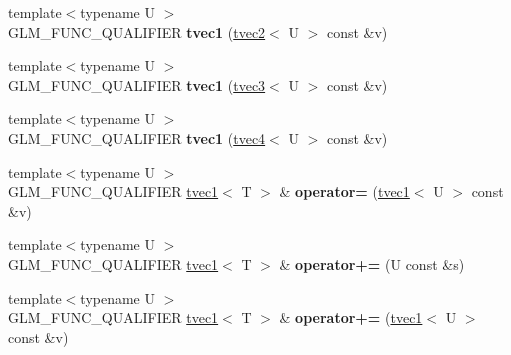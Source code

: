 \begin{DoxyCompactItemize}
\item 
\hypertarget{structglm_1_1detail_1_1tvec1_ac11b8a6aac35361031ef478d04805d55}{{\footnotesize template$<$typename U $>$ }\\G\-L\-M\-\_\-\-F\-U\-N\-C\-\_\-\-Q\-U\-A\-L\-I\-F\-I\-E\-R {\bfseries tvec1} (\hyperlink{structglm_1_1detail_1_1tvec2}{tvec2}$<$ U $>$ const \&v)}\label{structglm_1_1detail_1_1tvec1_ac11b8a6aac35361031ef478d04805d55}

\item 
\hypertarget{structglm_1_1detail_1_1tvec1_afdf233ab9bec4b5c963af10160fae693}{{\footnotesize template$<$typename U $>$ }\\G\-L\-M\-\_\-\-F\-U\-N\-C\-\_\-\-Q\-U\-A\-L\-I\-F\-I\-E\-R {\bfseries tvec1} (\hyperlink{structglm_1_1detail_1_1tvec3}{tvec3}$<$ U $>$ const \&v)}\label{structglm_1_1detail_1_1tvec1_afdf233ab9bec4b5c963af10160fae693}

\item 
\hypertarget{structglm_1_1detail_1_1tvec1_aaacbeeddc4e1562bf2ad1c3b2a5e2ea9}{{\footnotesize template$<$typename U $>$ }\\G\-L\-M\-\_\-\-F\-U\-N\-C\-\_\-\-Q\-U\-A\-L\-I\-F\-I\-E\-R {\bfseries tvec1} (\hyperlink{structglm_1_1detail_1_1tvec4}{tvec4}$<$ U $>$ const \&v)}\label{structglm_1_1detail_1_1tvec1_aaacbeeddc4e1562bf2ad1c3b2a5e2ea9}

\item 
\hypertarget{structglm_1_1detail_1_1tvec1_a2bb1fc8cccedfe815b64d020daad98ed}{{\footnotesize template$<$typename U $>$ }\\G\-L\-M\-\_\-\-F\-U\-N\-C\-\_\-\-Q\-U\-A\-L\-I\-F\-I\-E\-R \hyperlink{structglm_1_1detail_1_1tvec1}{tvec1}$<$ T $>$ \& {\bfseries operator=} (\hyperlink{structglm_1_1detail_1_1tvec1}{tvec1}$<$ U $>$ const \&v)}\label{structglm_1_1detail_1_1tvec1_a2bb1fc8cccedfe815b64d020daad98ed}

\item 
\hypertarget{structglm_1_1detail_1_1tvec1_a425c5210b310d697e6dc7521349aa1b0}{{\footnotesize template$<$typename U $>$ }\\G\-L\-M\-\_\-\-F\-U\-N\-C\-\_\-\-Q\-U\-A\-L\-I\-F\-I\-E\-R \hyperlink{structglm_1_1detail_1_1tvec1}{tvec1}$<$ T $>$ \& {\bfseries operator+=} (U const \&s)}\label{structglm_1_1detail_1_1tvec1_a425c5210b310d697e6dc7521349aa1b0}

\item 
\hypertarget{structglm_1_1detail_1_1tvec1_a6d0687c25b53cc583ad197aa8640a6b3}{{\footnotesize template$<$typename U $>$ }\\G\-L\-M\-\_\-\-F\-U\-N\-C\-\_\-\-Q\-U\-A\-L\-I\-F\-I\-E\-R \hyperlink{structglm_1_1detail_1_1tvec1}{tvec1}$<$ T $>$ \& {\bfseries operator+=} (\hyperlink{structglm_1_1detail_1_1tvec1}{tvec1}$<$ U $>$ const \&v)}\label{structglm_1_1detail_1_1tvec1_a6d0687c25b53cc583ad197aa8640a6b3}


\end{DoxyCompactItemize}
